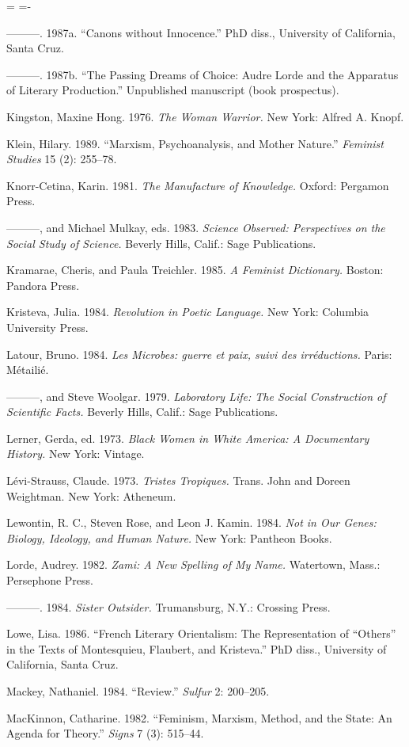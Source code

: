 \documentclass[DIV=12,%
               BCOR=10mm,%
               headinclude=false,%
               footinclude=false,open=any,%
               fontsize=11pt,%
               twoside,%
               paper=210mm:11in]%
               {scrbook}
\newenvironment*{amusebiblio}{
  \leftskip=\parindent
  \parindent=-\parindent
  \smallskip
  \indent
}{\smallskip}
\begin{document}
\begin{amusebiblio}
———. 1987a. “Canons without Innocence.” PhD diss., University of California, Santa Cruz.


———. 1987b. “The Passing Dreams of Choice: Audre Lorde and the Apparatus of Literary Production.” Unpublished manuscript (book prospectus).


Kingston, Maxine Hong. 1976. \emph{The Woman Warrior.} New York: Alfred A. Knopf.


Klein, Hilary. 1989. “Marxism, Psychoanalysis, and Mother Nature.” \emph{Feminist Studies} 15 (2): 255–78.


Knorr-Cetina, Karin. 1981. \emph{The Manufacture of Knowledge.} Oxford: Pergamon Press.


———, and Michael Mulkay, eds. 1983. \emph{Science Observed: Perspectives on the Social Study of Science.} Beverly Hills, Calif.: Sage Publications.


Kramarae, Cheris, and Paula Treichler. 1985. \emph{A Feminist Dictionary.} Boston: Pandora Press.


Kristeva, Julia. 1984. \emph{Revolution in Poetic Language.} New York: Columbia University Press.


Latour, Bruno. 1984. \emph{Les Microbes: guerre et paix, suivi des irréductions.} Paris: Métailié.


———, and Steve Woolgar. 1979. \emph{Laboratory Life: The Social Construction of Scientific Facts.} Beverly Hills, Calif.: Sage Publications.


Lerner, Gerda, ed. 1973. \emph{Black Women in White America: A Documentary History.} New York: Vintage.


Lévi-Strauss, Claude. 1973. \emph{Tristes Tropiques.} Trans. John and Doreen Weightman. New York: Atheneum.


Lewontin, R. C., Steven Rose, and Leon J. Kamin. 1984. \emph{Not in Our Genes: Biology, Ideology, and Human Nature.} New York: Pantheon Books.


Lorde, Audrey. 1982. \emph{Zami: A New Spelling of My Name.} Watertown, Mass.: Persephone Press.


———. 1984. \emph{Sister Outsider.} Trumansburg, N.Y.: Crossing Press.


Lowe, Lisa. 1986. “French Literary Orientalism: The Representation of “Others” in the Texts of Montesquieu, Flaubert, and Kristeva.” PhD diss., University of California, Santa Cruz.


Mackey, Nathaniel. 1984. “Review.” \emph{Sulfur} 2: 200–205.


MacKinnon, Catharine. 1982. “Feminism, Marxism, Method, and the State: An Agenda for Theory.” \emph{Signs} 7 (3): 515–44.



\end{amusebiblio}
\end{document}
